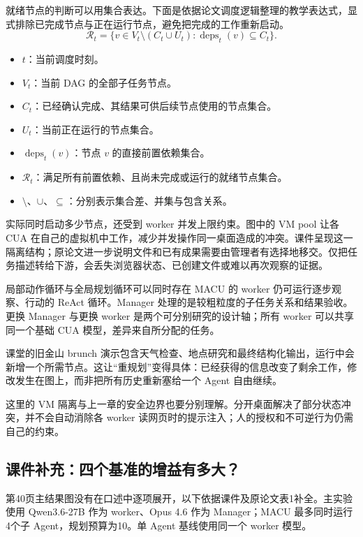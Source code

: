 \documentclass[11pt,a4paper]{article}
\begin{document}
就绪节点的判断可以用集合表达。下面是依据论文调度逻辑整理的教学表达式，显式排除已完成节点与正在运行节点，避免把完成的工作重新启动。
$$
\mathcal{R}_t=\{v\in V_t\setminus(C_t\cup U_t):\operatorname{deps}_t(v)\subseteq C_t\}.
$$
\begin{itemize}
\item $t$：当前调度时刻。
\item $V_t$：当前 DAG 的全部子任务节点。
\item $C_t$：已经确认完成、其结果可供后续节点使用的节点集合。
\item $U_t$：当前正在运行的节点集合。
\item $\operatorname{deps}_t(v)$：节点 $v$ 的直接前置依赖集合。
\item $\mathcal{R}_t$：满足所有前置依赖、且尚未完成或运行的就绪节点集合。
\item $\setminus$、$\cup$、$\subseteq$：分别表示集合差、并集与包含关系。
\end{itemize}

实际同时启动多少节点，还受到 worker 并发上限约束。图中的 VM pool 让各 CUA 在自己的虚拟机中工作，减少并发操作同一桌面造成的冲突。课件呈现这一隔离结构；原论文进一步说明文件和已有成果需要由管理者有选择地移交。仅把任务描述转给下游，会丢失浏览器状态、已创建文件或难以再次观察的证据。

\begin{importantbox}{局部动作循环与全局规划循环可以同时存在}
MACU 的 worker 仍可运行逐步观察、行动的 ReAct 循环。Manager 处理的是较粗粒度的子任务关系和结果验收。更换 Manager 与更换 worker 是两个可分别研究的设计轴；所有 worker 可以共享同一个基础 CUA 模型，差异来自所分配的任务。
\end{importantbox}

课堂的旧金山 brunch 演示包含天气检查、地点研究和最终结构化输出，运行中会新增一个所需节点。这让“重规划”变得具体：已经获得的信息改变了剩余工作，修改发生在图上，而非把所有历史重新塞给一个 Agent 自由继续。

这里的 VM 隔离与上一章的安全边界也要分别理解。分开桌面解决了部分状态冲突，并不会自动消除各 worker 读网页时的提示注入；人的授权和不可逆行为仍需自己的约束。

\subsection{课件补充：四个基准的增益有多大？}
第40页主结果图没有在口述中逐项展开，以下依据课件及原论文表1补全。主实验使用 Qwen3.6-27B 作为 worker、Opus 4.6 作为 Manager；MACU 最多同时运行4个子 Agent，规划预算为10。单 Agent 基线使用同一个 worker 模型。
\end{document}
